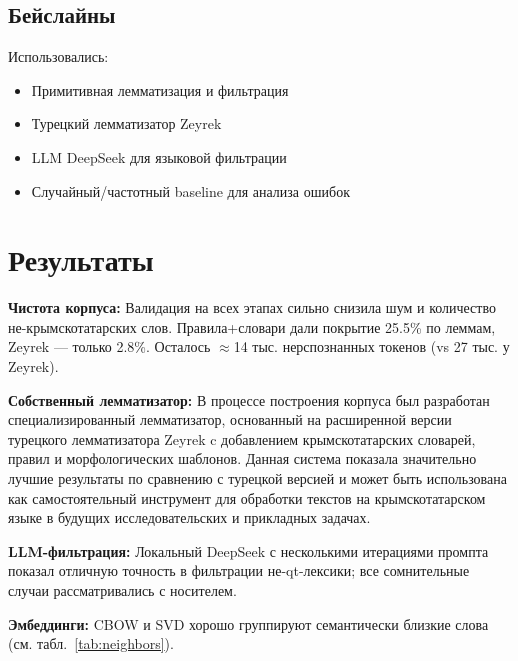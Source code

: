 \documentclass{article}
\begin{document}
\subsection{Бейслайны}
Использовались:
\begin{itemize}
    \item Примитивная лемматизация и фильтрация
    \item Турецкий лемматизатор Zeyrek
    \item LLM DeepSeek для языковой фильтрации
    \item Случайный/частотный baseline для анализа ошибок
\end{itemize}

\section{Результаты}
\textbf{Чистота корпуса:} Валидация на всех этапах сильно снизила шум и количество не-крымскотатарских слов. Правила+словари дали покрытие 25.5\% по леммам, Zeyrek — только 2.8\%. Осталось $\approx$14 тыс. нерспознанных токенов (vs 27 тыс. у Zeyrek).

\textbf{Собственный лемматизатор:} В процессе построения корпуса был разработан специализированный лемматизатор, основанный на расширенной версии турецкого лемматизатора Zeyrek c добавлением крымскотатарских словарей, правил и морфологических шаблонов. Данная система показала значительно лучшие результаты по сравнению с турецкой версией и может быть использована как самостоятельный инструмент для обработки текстов на крымскотатарском языке в будущих исследовательских и прикладных задачах.

\textbf{LLM-фильтрация:} Локальный DeepSeek с несколькими итерациями промпта показал отличную точность в фильтрации не-qt-лексики; все сомнительные случаи рассматривались с носителем.

\textbf{Эмбеддинги:} CBOW и SVD хорошо группируют семантически близкие слова (см. табл.~\ref{tab:neighbors}).
\end{document}
